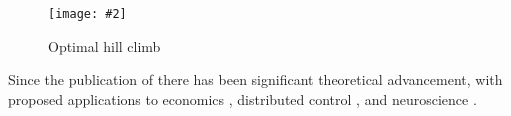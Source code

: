 \documentclass[final,12pt]{colt2018} %
\def\rd#1{{\color{red}#1}}
\newcommand{\field}[1]{\mathbb{#1}}
\def\Re{\field{R}}
\def\haP{{\widehat P}}
\def\Ebox#1#2{%
\begin{center}
\texttt{[image: \#2]} \end{center}}
\def\Re{\field{R}}
\begin{document}
%




\begin{wrapfigure}{l}{.28\hsize}
\vspace{-.5cm}
\Ebox{.95}{TodCar.pdf}
\vspace{-.5cm}\caption{\small \small
Optimal hill climb}
\label{f:TodCar} 
\vspace{-.25cm}
\end{wrapfigure} 

 

Since the publication of \cite{tod07} there has been significant theoretical advancement, with proposed applications to economics \cite{guaragwil14}, distributed control \cite{meybarbusyueehr15}, and neuroscience \cite{doy09}.
\end{document}

